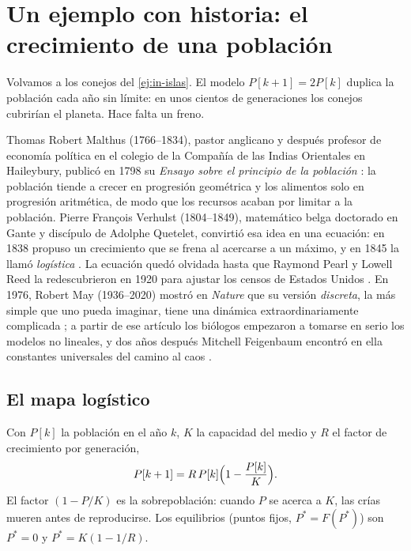 \section{Un ejemplo con historia: el crecimiento de una población}
\label{sec:in-poblaciones}

Volvamos a los conejos del \cref{ej:in-islas}. El modelo $P[k+1]=2P[k]$ duplica la población cada año sin límite: en unos cientos de generaciones los conejos cubrirían el planeta. Hace falta un freno.

\begin{historia}
Thomas Robert Malthus (1766--1834), pastor anglicano y después profesor de economía política en el colegio de la Compañía de las Indias Orientales en Haileybury, publicó en 1798 su \emph{Ensayo sobre el principio de la población} \citep{Mal86}: la población tiende a crecer en progresión geométrica y los alimentos solo en progresión aritmética, de modo que los recursos acaban por limitar a la población. Pierre François Verhulst (1804--1849), matemático belga doctorado en Gante y discípulo de Adolphe Quetelet, convirtió esa idea en una ecuación: en 1838 propuso un crecimiento que se frena al acercarse a un máximo, y en 1845 la llamó \emph{logística} \citep{Ver45}. La ecuación quedó olvidada hasta que Raymond Pearl y Lowell Reed la redescubrieron en 1920 para ajustar los censos de Estados Unidos \citep{PeRe20}. En 1976, Robert May (1936--2020) mostró en \emph{Nature} que su versión \emph{discreta}, la más simple que uno pueda imaginar, tiene una dinámica extraordinariamente complicada \citep{May76}; a partir de ese artículo los biólogos empezaron a tomarse en serio los modelos no lineales, y dos años después Mitchell Feigenbaum encontró en ella constantes universales del camino al caos \citep{Fei78}.
\end{historia}

\subsection{El mapa logístico}

Con $P[k]$ la población en el año $k$, $K$ la capacidad del medio y $R$ el factor de crecimiento por generación,
\begin{equation}
  P[k+1]=R\,P[k]\Bigl(1-\frac{P[k]}{K}\Bigr).
  \label{eq:in-mapa}
\end{equation}
El factor $(1-P/K)$ es la sobrepoblación: cuando $P$ se acerca a $K$, las crías mueren antes de reproducirse. Los equilibrios (puntos fijos, $P^*=F(P^*)$) son $P^*=0$ y $P^*=K(1-1/R)$.

